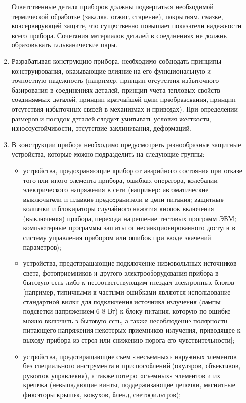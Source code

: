 \begin{enumerate}
Ответственные детали приборов должны подвергаться необходимой термической обработке (закалка, отжиг, старение), покрытиям, смазке, консервирующей защите, что существенно повышает показатели надежности всего прибора. Сочетания материалов деталей в соединениях не должны образовывать гальванические пары.
\item Разрабатывая конструкцию прибора, необходимо соблюдать принципы конструирования, оказывающие влияние на его функциональную и точностную надежность (например, принцип отсутствия избыточного базирования в соединениях деталей, принцип учета тепловых свойств соединяемых деталей, принцип кратчайшей цепи преобразования, принцип отсутствия избыточных связей в механизмах и приводах).
При определении размеров и посадок деталей следует учитывать условия жесткости, износоустойчивости, отсутствие заклинивания, деформаций.
\item В конструкции прибора необходимо предусмотреть разнообразные защитные устройства, которые можно подразделить на следующие группы:
\begin{itemize}
\item устройства, предохраняющие прибор от аварийного состояния при отказе того или иного элемента прибора, ошибках оператора, колебании электрического напряжения в сети (например: автоматические выключатели и плавкие предохранители в цепи питания; защитные колпачки и блокираторы случайного нажатия кнопок включения (выключения) прибора, перехода на решение тестовых программ ЭВМ; компьютерные программы защиты от несанкционированного доступа в систему управления прибором или ошибок при вводе значений параметров);
\item устройства, предотвращающие подключение низковольтных источников света, фотоприемников и другого электрооборудования прибора в бытовую сеть либо к несоответствующим гнездам электронных блоков [например, типичными и частыми ошибками являются использование стандартной вилки для подключения источника излучения (лампы подсветки напряжением 6-8 Вт) к блоку питания, которую по ошибке можно включить в бытовую сеть, а также несоблюдение полярности питающего напряжения некоторых приемников излучения, приводящее к выходу прибора из строя или снижению порога его чувствительности];
\item устройства, предотвращающие съем «несъемных» наружных элементов без специального инструмента и приспособлений (окуляров, объективов, рукояток управления), а также потерю «съемных» элементов и их крепежа (невыпадающие винты, поддерживающие цепочки, магнитные фиксаторы крышек, кожухов, бленд, светофильтров);

\end{itemize}
\end{enumerate}
